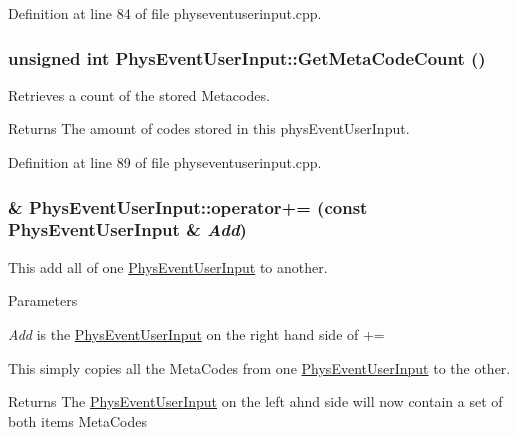 Definition at line 84 of file physeventuserinput.cpp.

\hypertarget{classPhysEventUserInput_a86df812a38566a572134100a422a8799}{
\subsubsection[{GetMetaCodeCount}]{\setlength{\rightskip}{0pt plus 5cm}unsigned int PhysEventUserInput::GetMetaCodeCount ()}}
\label{dc/d0e/classPhysEventUserInput_a86df812a38566a572134100a422a8799}


Retrieves a count of the stored Metacodes. 

\begin{DoxyReturn}{Returns}
The amount of codes stored in this physEventUserInput. 
\end{DoxyReturn}


Definition at line 89 of file physeventuserinput.cpp.

\hypertarget{classPhysEventUserInput_a257c2e093b5736324e39d5fac0d6de2a}{
\subsubsection[{operator+=}]{ \& PhysEventUserInput::operator+= (const {\bf PhysEventUserInput} \& {\em Add})}}
\label{dc/d0e/classPhysEventUserInput_a257c2e093b5736324e39d5fac0d6de2a}


This add all of one \hyperlink{classPhysEventUserInput}{PhysEventUserInput} to another. 


\begin{DoxyParams}{Parameters}
\item[{\em Add}]is the \hyperlink{classPhysEventUserInput}{PhysEventUserInput} on the right hand side of +=\end{DoxyParams}
This simply copies all the MetaCodes from one \hyperlink{classPhysEventUserInput}{PhysEventUserInput} to the other. \begin{DoxyReturn}{Returns}
The \hyperlink{classPhysEventUserInput}{PhysEventUserInput} on the left ahnd side will now contain a set of both items MetaCodes 
\end{DoxyReturn}


